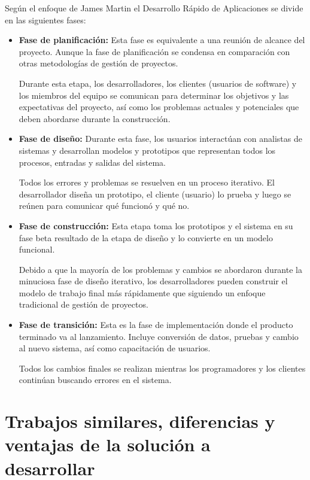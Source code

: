 Según el enfoque de James Martin \cite{RADJamesMartin} el Desarrollo Rápido de Aplicaciones se divide en las siguientes fases:

\begin{itemize}
    \item \textbf{Fase de planificación:} Esta fase es equivalente a una reunión de alcance del proyecto. Aunque la fase de planificación se condensa en comparación con otras metodologías de gestión de proyectos.

          Durante esta etapa, los desarrolladores, los clientes (usuarios de software) y los miembros del equipo se comunican para determinar los objetivos y las expectativas del proyecto, así como los problemas actuales y potenciales que deben abordarse durante la construcción.

    \item \textbf{Fase de diseño:} Durante esta fase, los usuarios interactúan con analistas de sistemas y desarrollan modelos y prototipos que representan todos los procesos, entradas y salidas del sistema.

          Todos los errores y problemas se resuelven en un proceso iterativo. El desarrollador diseña un prototipo, el cliente (usuario) lo prueba y luego se reúnen para comunicar qué funcionó y qué no.

    \item \textbf{Fase de construcción:} Esta etapa toma los prototipos y el sistema en su fase beta resultado de la etapa de diseño y lo convierte en un modelo funcional.

          Debido a que la mayoría de los problemas y cambios se abordaron durante la minuciosa fase de diseño iterativo, los desarrolladores pueden construir el modelo de trabajo final más rápidamente que siguiendo un enfoque tradicional de gestión de proyectos.

    \item \textbf{Fase de transición:} Esta es la fase de implementación donde el producto terminado va al lanzamiento. Incluye conversión de datos, pruebas y cambio al nuevo sistema, así como capacitación de usuarios.

          Todos los cambios finales se realizan mientras los programadores y los clientes continúan buscando errores en el sistema.

\end{itemize}


\section{Trabajos similares, diferencias y ventajas de la solución a desarrollar}

